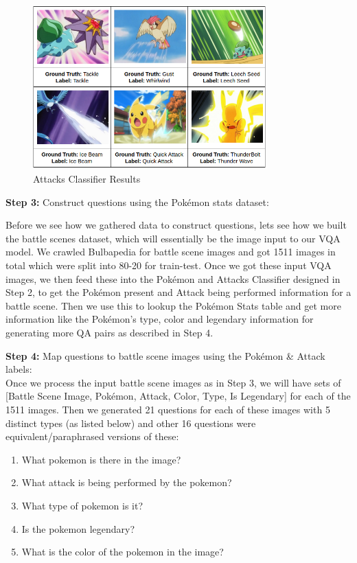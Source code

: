 \documentclass[journal, a4paper]{IEEEtran}
\begin{document}
\begin{figure}[ht]
    \caption{Attacks Classifier Results}
\centering
 \includegraphics[scale = 0.6, width=9cm]{attackresult.png}
\end{figure}

\textbf{Step 3:} Construct questions using the Pok\'emon stats dataset:

Before we see how we gathered data to construct questions, lets see how we built the battle scenes dataset, which will essentially be the image input to our VQA model. We crawled Bulbapedia for battle scene images and got 1511 images in total which were split into 80-20 for train-test. Once we got these input VQA images, we then feed these into the Pok\'emon and Attacks Classifier designed in Step 2, to get the Pok\'emon present and Attack being performed information for a battle scene. Then we use this to lookup the Pok\'emon Stats \cite{STATS} table and get more information like the Pok\'emon's type, color and legendary information for generating more QA pairs as described in Step 4.

\textbf{Step 4:} Map questions to battle scene images using the Pok\'emon \& Attack labels:\\
Once we process the input battle scene images as in Step 3, we will have sets of [Battle Scene Image, Pok\'emon, Attack, Color, Type, Is Legendary] for each of the 1511 images. Then we generated 21 questions for each of these images with 5 distinct types (as listed below) and other 16 questions were equivalent/paraphrased versions of these:

\begin{enumerate}
    \item What pokemon is there in the image?
    \item What attack is being performed by the pokemon?
    \item What type of pokemon is it?
    \item Is the pokemon legendary?
    \item What is the color of the pokemon in the image?
\end{enumerate}
               
\end{document}
